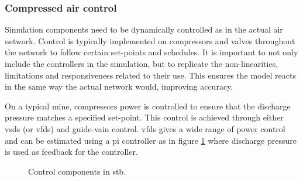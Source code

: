 		\subsubsection{Compressed air control}\label{Controllers}
			Simulation components need to be dynamically controlled as in the actual air network. Control is typically implemented on compressors and valves throughout the network to follow certain set-points and schedules. It is important to not only include the controllers in the simulation, but to replicate the non-linearities, limitations and responsiveness related to their use. This ensures the model reacts in the same way the actual network would, improving accuracy.
			\par 
			On a typical mine, compressors power is controlled to ensure that the discharge pressure matches a specified set-point. This control is achieved through either \glspl{vsd} (or \glspl{vfd}) and guide-vain control. \glspl{vfd} gives a wide range of power control and can be estimated using a \gls{pi} controller as in figure \ref{fig: Controller models} where discharge pressure is used as feedback for the controller. 
	\begin{figure}[h]
		\centering
		\caption{Control components in \gls{stb}.}
		\label{fig: Controller models}
	\end{figure}
